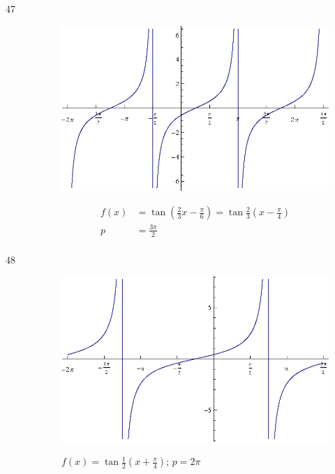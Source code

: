 \documentclass{exam}
\begin{document}
\begin{description}
      \item[47] 
        \begin{figure}[H]
          \centering
          \includegraphics[scale=0.9]{exercise47.eps}

          \begin{align*}
            f(x) &= \tan \left( \frac{2}{3} x - \frac{\pi}{6} \right) = \tan \frac{2}{3} \left( x - \frac{\pi}{4} \right) \\
            p    & = \frac{3 \pi}{2} \\
          \end{align*}
        \end{figure}

      \item[48] 
        \begin{figure}[H]
          \centering
          \includegraphics[scale=0.9]{exercise48.eps}

          $f(x) = \tan \frac{1}{2} \left( x + \frac{\pi}{4} \right)$; $p =2 \pi$ 
        \end{figure}


\end{description}
\end{document}

